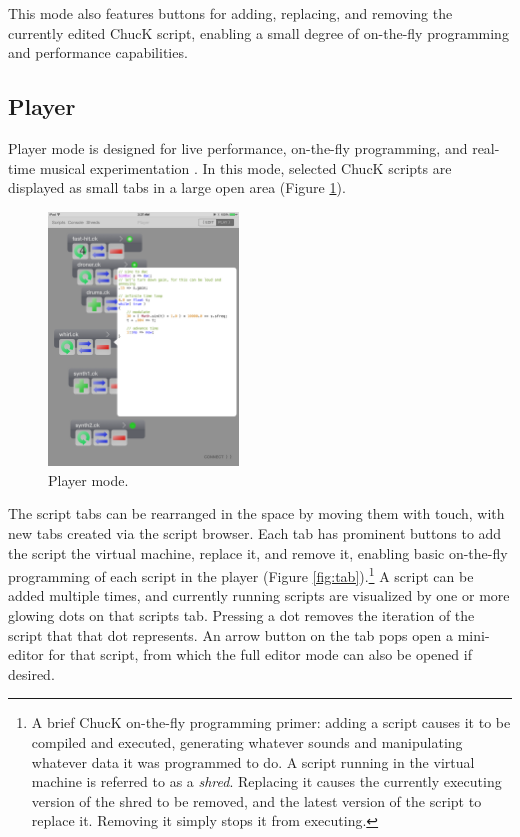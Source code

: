 \documentclass{article}
\begin{document}
This mode also features buttons for adding, replacing, and removing the currently edited ChucK script, enabling a small degree of on-the-fly programming and performance capabilities. 

\subsection{Player}

Player mode is designed for live performance, on-the-fly programming, and real-time musical experimentation . 
In this mode, selected ChucK scripts are displayed as small tabs in a large open area (Figure \ref{fig:player}). 

\begin{figure}[h]
	\centering
		\includegraphics[width=0.45\textwidth]{figures/player.png}
	\caption{Player mode. }
	\label{fig:player}
\end{figure}

The script tabs can be rearranged in the space by moving them with touch, with new tabs  created via the script browser. 
Each tab has prominent buttons to add the script the virtual machine, replace it, and remove it, enabling basic on-the-fly programming of each script in the player (Figure \ref{fig:tab}).\footnote{
A brief ChucK on-the-fly programming primer: adding a script causes it to be compiled and executed, generating whatever sounds and manipulating whatever data it was programmed to do. 
A script running in the virtual machine is referred to as a \textit{shred}. 
Replacing it causes the currently executing version of the shred to be removed, and the latest version of the script to replace it. 
Removing it simply stops it from executing.}
A script can be added multiple times, and currently running scripts are visualized by one or more glowing dots on that scripts tab. 
Pressing a dot removes the iteration of the script that that dot represents. 
An arrow button on the tab pops open a mini-editor for that script, from which the full editor mode can also be opened if desired. 
\end{document}
